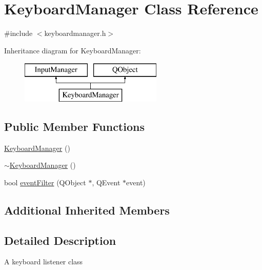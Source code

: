 \hypertarget{class_keyboard_manager}{\section{Keyboard\+Manager Class Reference}
\label{class_keyboard_manager}
}


{\ttfamily \#include $<$keyboardmanager.\+h$>$}

Inheritance diagram for Keyboard\+Manager\+:\begin{figure}[H]
\begin{center}
\leavevmode
\includegraphics[height=2.000000cm]{class_keyboard_manager}
\end{center}
\end{figure}
\subsection*{Public Member Functions}
\begin{DoxyCompactItemize}
\item 
\hyperlink{class_keyboard_manager_a0aaf2801dbf2337111a5221b9acd6078}{Keyboard\+Manager} ()
\item 
\hyperlink{class_keyboard_manager_a5321f1327f94403ead6b7fa083ae7cee}{$\sim$\+Keyboard\+Manager} ()
\item 
bool \hyperlink{class_keyboard_manager_ae5934173dd590f5df2050afda354118e}{event\+Filter} (Q\+Object $\ast$, Q\+Event $\ast$event)
\end{DoxyCompactItemize}
\subsection*{Additional Inherited Members}


\subsection{Detailed Description}
A keyboard listener class 

